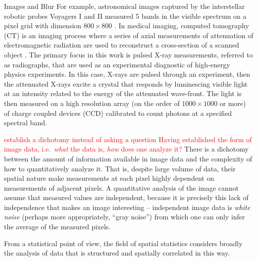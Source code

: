 \begin{chapter}{Images and Blur}
  For example, astronomical images captured by the interstellar robotic probes Voyagers I and II measured 5 bands in the visible spectrum on a pixel grid with dimension $800 \times 800$ \citep{voyager}.
  In medical imaging, computed tomography (CT) is an imaging process where a series of axial measurements of attenuation of electromagnetic radiation are used to reconstruct a cross-section of a scanned object \citep{epstein2008}.
  The primary focus in this work is pulsed X-ray measurements, referred to as radiographs, that are used as an experimental diagnostic of high-energy physics experiments.  
  In this case, X-rays are pulsed through an experiment, then the attenuated X-rays excite a crystal that responds by luminescing visible light at an intensity related to the energy of the attenuated wave-front.  
  The light is then measured on a high resolution array (on the order of $1000\times1000$ or more) of charge coupled devices (CCD) calibrated to count photons at a specified spectral band.


\textcolor{red}{
establish a dichotomy instead of asking a question
  Having established the form of image data, i.e.~\emph{what} the data is, \emph{how} does one analyze it?
}
There is a dichotomy between the amount of information available in image data and the complexity of how to quantitatively analyze it.
That is, despite large volume of data, their spatial nature make measurements at each pixel highly dependent on measurements of adjacent pixels.
  A quantitative analysis of the image cannot assume that measured values are independent, because it is precisely this lack of independence that makes an image interesting -- independent image data is \emph{white noise} (perhaps more appropriately, ``gray noise'') from which one can only infer the average of the measured pixels.

  From a statistical point of view, the field of spatial statistics considers broadly the analysis of data that is structured and spatially correlated in this way.


\end{chapter}
